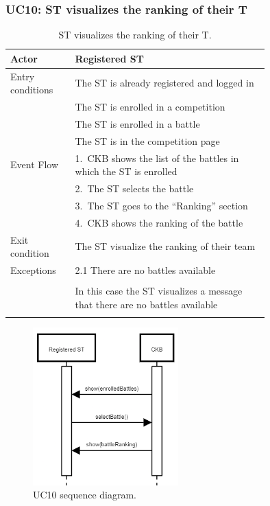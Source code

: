\subsubsection*{UC10: ST visualizes the ranking of their T}
\begin{center}
  \begin{longtable}{l|p{0.75\linewidth}}
    \hline
    Actor & Registered ST \\
    \hline
    Entry conditions & The ST is already registered and logged in \\
    & The ST is enrolled in a competition \\
    & The ST is enrolled in a battle \\
    & The ST is in the competition page \\
    \hline
    Event Flow & 1.\ CKB shows the list of the battles in which the ST is enrolled \\
    & 2.\ The ST selects the battle \\
    & 3.\ The ST goes to the “Ranking” section \\
    & 4.\ CKB shows the ranking of the battle \\
    \hline
    Exit condition &  The ST visualize the ranking of their team \\
    \hline
    Exceptions & 2.1 There are no battles available \\ \\
    & In this case the ST visualizes a message that there are no battles available \\
    \hline
    \caption{ST visualizes the ranking of their T.}
    \label{tab: ST_visualize_ranking}
  \end{longtable}

  \begin{figure} [H]
    \begin{center}
        \includegraphics[width=0.5\textwidth,height=\textheight,keepaspectratio]{Images/UseCaseDiagrams/UC10.png}
        \caption{UC10 sequence diagram.}
        \label{fig: UC10_sequence_diagram}
    \end{center}
  \end{figure}
\end{center}

